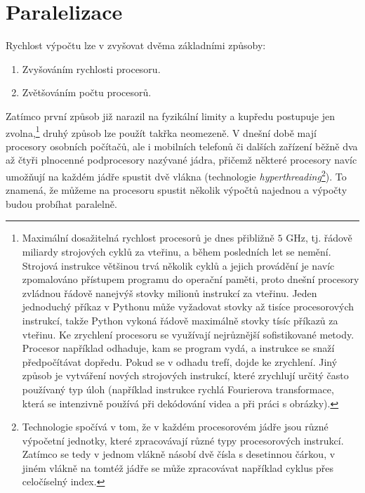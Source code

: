\documentclass[a4paper,11pt,twoside]{article}
\theoremstyle{red}
\theoremstyle{green}
\begin{document}
    \section{Paralelizace}
    Rychlost výpočtu lze v zvyšovat dvěma základními způsoby:
    \begin{enumerate}
        \item Zvyšováním rychlosti procesoru.
        \item Zvětšováním počtu procesorů.
    \end{enumerate}
    Zatímco první způsob již narazil na fyzikální limity a kupředu postupuje jen zvolna,\footnote{
        Maximální dosažitelná rychlost procesorů je dnes přibližně $5$ GHz, tj. řádově miliardy strojových cyklů za vteřinu, a během posledních let se nemění. 
        Strojová instrukce většinou trvá několik cyklů a jejich provádění je navíc zpomalováno přístupem programu do operační paměti, proto dnešní procesory zvládnou řádově nanejvýš stovky milionů instrukcí za vteřinu.
        Jeden jednoduchý příkaz v Pythonu může vyžadovat stovky až tisíce procesorových instrukcí, takže Python vykoná řádově maximálně stovky tísíc příkazů za vteřinu.
        Ke zrychlení procesoru se využívají nejrůznější sofistikované metody. 
        Procesor například odhaduje, kam se program vydá, a instrukce se snaží předpočítávat dopředu. 
        Pokud se v odhadu trefí, dojde ke zrychlení.
        Jiný způsob je vytváření nových strojových instrukcí, které zrychlují určitý často používaný typ úloh (například instrukce rychlá Fourierova transformace, která se intenzivně používá při dekódování videa a při práci s obrázky).
    } 
    druhý způsob lze použít takřka neomezeně.
    V dnešní době mají procesory osobních počítačů, ale i mobilních telefonů či dalších zařízení běžně dva až čtyři plnocenné podprocesory nazývané jádra, přičemž některé procesory navíc umožňují na každém jádře spustit dvě vlákna (technologie \emph{hyperthreading}\footnote{
        Technologie spočívá v tom, že v každém procesorovém jádře jsou různé výpočetní jednotky, které zpracovávají různé typy procesorových instrukcí.
        Zatímco se tedy v jednom vlákně násobí dvě čísla s desetinnou čárkou, v jiném vlákně na tomtéž jádře se může zpracovávat například cyklus přes celočíselný index.
    }).
    To znamená, že můžeme na procesoru spustit několik výpočtů najednou a výpočty budou probíhat paralelně.
    
\end{document}

